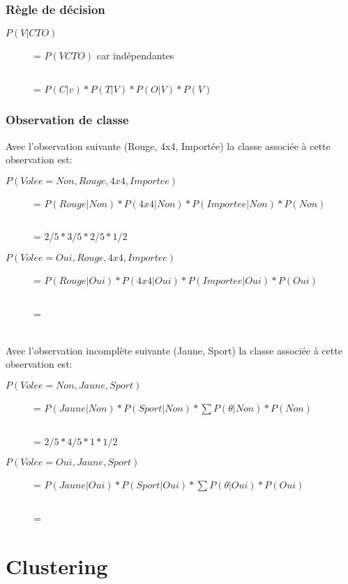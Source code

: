 \subsection{Règle de décision}
\begin{description}
\item[$P(V|CTO)$] = $P(VCTO)$ car indépendantes
\item[$        $] = $P(C|v)*P(T|V)*P(O|V)*P(V)$
\end{description}

\subsection{Observation de classe}
Avec l'observation suivante (Rouge, 4x4, Importée) la classe associée à cette observation est:
\begin{description}
\item[$P(Volee=Non,Rouge,4x4,Importee)$] = $P(Rouge|Non)*P(4x4|Non)*P(Importee|Non)*P(Non)$
\item[$                               $] = $2/5 * 3/5 * 2/5 * 1/2$
\end{description}
\begin{description}
\item[$P(Volee=Oui,Rouge,4x4,Importee)$] = $P(Rouge|Oui)*P(4x4|Oui)*P(Importee|Oui)*P(Oui)$
\item[$                               $] = $ $
\end{description}

\ \\
Avec l'observation incomplète suivante (Jaune, Sport) la classe associée à cette observation est:
\begin{description}
\item[$P(Volee=Non,Jaune,Sport)$] = $P(Jaune|Non)*P(Sport|Non)* \sum P(\theta|Non)*P(Non)$
\item[$                               $] = $2/5 * 4/5 * 1 * 1/2$
\end{description}
\begin{description}
\item[$P(Volee=Oui,Jaune,Sport)$] = $P(Jaune|Oui)*P(Sport|Oui)*\sum P(\theta|Oui)*P(Oui)$
\item[$                               $] = $ $
\end{description}
\pagebreak

\chapter{Clustering}
\pagebreak